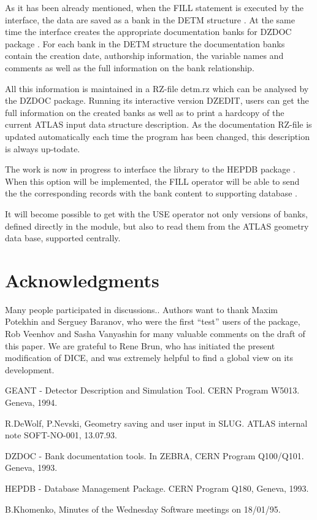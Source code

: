 As it has been already mentioned,
when the FILL statement is executed by the \as interface,
the data are saved as a bank in the DETM structure \cite{slug}.
At the same time the \as interface creates
the appropriate documentation banks for DZDOC package \cite{dzdoc}.
For each bank in the DETM structure the documentation banks contain
the creation date, authorship information,
the variable names and comments 
as well as the full information on the bank relationship.

All this information is maintained in a RZ-file detm.rz
which can be analysed by the DZDOC package.  %
Running its interactive version DZEDIT, 
users can get the full information on the
created banks as well as to print 
a hardcopy of the current ATLAS input data structure 
description.
As the documentation RZ-file is updated automatically
each time the program has been changed,
this description is always up-todate.

The work is now in progress to interface the \as library
to the HEPDB package \cite{hepdb}.
When this option will be implemented, the FILL operator
will be able to send the the corresponding records 
with the bank content to supporting database \cite{boris}.

It will become possible to get with the USE operator
not only versions of banks, defined directly in the module,
but also to read them from the ATLAS geometry data base,
supported centrally.
  
 
\section*{Acknowledgments}

Many people participated in discussions..
Authors want to thank Maxim Potekhin
and Serguey Baranov, who
were the first ``test'' users of the \as  package,
Rob Veenhov and Sasha Vanyashin for 
many valuable comments
on the draft of this paper.
We are grateful to Rene Brun, 
who has initiated the present modification of DICE,
and was extremely helpful to find 
a global view on its development.


\begin{thebibliography}{99}
 GEANT - Detector Description and Simulation Tool.
                CERN Program W5013. Geneva, 1994.

  R.DeWolf, P.Nevski,
                Geometry saving and user input in SLUG.
                ATLAS internal note SOFT-NO-001, 13.07.93.

                
 DZDOC - Bank documentation tools.
                In ZEBRA, CERN Program Q100/Q101. Geneva, 1993.

 HEPDB - Database Management Package.
                CERN Program Q180, Geneva, 1993.

 B.Khomenko, Minutes of the Wednesday Software meetings 
                on 18/01/95.                
\end{thebibliography}

